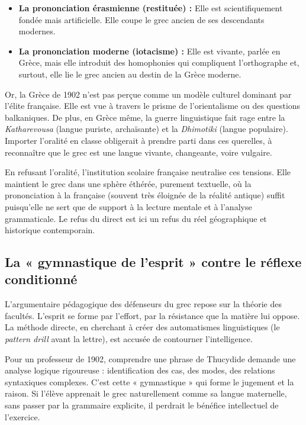 \begin{itemize}\item \textbf{La prononciation érasmienne (restituée) :} Elle est scientifiquement fondée mais artificielle. Elle coupe le grec ancien de ses descendants modernes.\item \textbf{La prononciation moderne (iotacisme) :} Elle est vivante, parlée en Grèce, mais elle introduit des homophonies qui compliquent l'orthographe et, surtout, elle lie le grec ancien au destin de la Grèce moderne.\cite{I-2-2-ref13}\end{itemize}Or, la Grèce de 1902 n'est pas perçue comme un modèle culturel dominant par l'élite française. Elle
est vue à travers le prisme de l'orientalisme ou des questions balkaniques. De plus, en Grèce même,
la guerre linguistique fait rage entre la \textit{Katharevousa} (langue puriste, archaïsante) et la
\textit{Dhimotiki} (langue populaire).\cite{I-2-2-ref13} Importer l'oralité en classe obligerait à
prendre parti dans ces querelles, à reconnaître que le grec est une langue vivante, changeante,
voire \og vulgaire\fg{}.

En refusant l'oralité, l'institution scolaire française neutralise ces tensions. Elle maintient le
grec dans une sphère éthérée, purement textuelle, où la prononciation \og à la française\fg{}
(souvent très éloignée de la réalité antique) suffit puisqu'elle ne sert que de support à la lecture
mentale et à l'analyse grammaticale. Le refus du direct est ici un refus du réel géographique et
historique contemporain.\cite{I-2-2-ref15}



\subsection{La « gymnastique de l'esprit » contre le réflexe conditionné}

L'argumentaire pédagogique des défenseurs du grec repose sur la théorie des facultés. L'esprit se
forme par l'effort, par la résistance que la matière lui oppose. La méthode directe, en cherchant à
créer des automatismes linguistiques (le \textit{pattern drill} avant la lettre), est accusée de
contourner l'intelligence.\cite{I-2-2-ref12}

Pour un professeur de 1902, comprendre une phrase de Thucydide demande une analyse logique
rigoureuse : identification des cas, des modes, des relations syntaxiques complexes. C'est cette «
gymnastique » qui forme le jugement et la raison.\cite{I-2-2-ref16} Si l'élève apprenait le grec \og
naturellement\fg{} comme sa langue maternelle, sans passer par la grammaire explicite, il perdrait
le bénéfice intellectuel de l'exercice.

